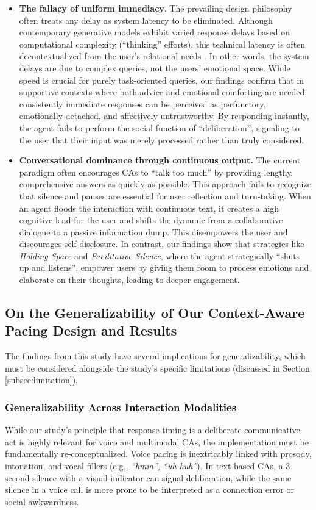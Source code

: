 \begin{itemize}
    \item \textbf{The fallacy of uniform immediacy}. The prevailing design philosophy often treats any delay as system latency to be eliminated. Although contemporary generative models exhibit varied response delays based on computational complexity (``thinking'' efforts), this technical latency is often decontextualized from the user's relational needs \cite{poppe2011backchannels}. In other words, the system delays are due to complex queries, not the users' emotional space. While speed is crucial for purely task-oriented queries, our findings confirm that in supportive contexts where both advice and emotional comforting are needed, consistently immediate responses can be perceived as perfunctory, emotionally detached, and affectively untrustworthy. By responding instantly, the agent fails to perform the social function of ``deliberation'', signaling to the user that their input was merely processed rather than truly considered. 
    \item \textbf{Conversational dominance through continuous output.} The current paradigm often encourages CAs to ``talk too much'' by providing lengthy, comprehensive answers as quickly as possible. This approach fails to recognize that silence and pauses are essential for user reflection and turn-taking. When an agent floods the interaction with continuous text, it creates a high cognitive load for the user and shifts the dynamic from a collaborative dialogue to a passive information dump. This disempowers the user and discourages self-disclosure. In contrast, our findings show that strategies like \emph{Holding Space} and \emph{Facilitative Silence}, where the agent strategically ``shuts up and listens'', empower users by giving them room to process emotions and elaborate on their thoughts, leading to deeper engagement.
\end{itemize}


\subsection{On the Generalizability of Our Context-Aware Pacing Design and Results}
The findings from this study have several implications for generalizability, which must be considered alongside the study's specific limitations (discussed in Section \ref{subsec:limitation}).

\subsubsection{\textcolor{black}{Generalizability Across Interaction Modalities}}
While our study's principle that response timing is a deliberate communicative act is highly relevant for voice and multimodal CAs, the implementation must be fundamentally re-conceptualized. Voice pacing is inextricably linked with prosody, intonation, and vocal fillers (e.g., \textit{``hmm'', ``uh-huh''}). In text-based CAs, a 3-second silence with a visual indicator can signal deliberation, while the same silence in a voice call is more prone to be interpreted as a connection error or social awkwardness.

